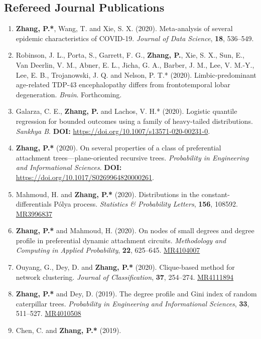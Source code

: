 \documentclass[margin]{res}
\def\MR#1{\href{http://www.ams.org/mathscinet-getitem?mr=#1}{MR#1}}
\begin{document}
\begin{resume}
\subsection{Refereed Journal Publications}
\begin{enumerate}
	\item {\sc \bf Zhang, P.*}, {\sc Wang, T.} and {\sc Xie, S. X.} 
	(2020). Meta-analysis of several epidemic characteristics of 
	COVID-19. {\em Journal of Data Science}, {\bf 18}, 536--549.
	\item {\sc Robinson, J. L., Porta, S., Garrett, F. G.}, {\sc \bf 
	Zhang, P.}, {\sc Xie, S. X., Sun, E., Van Deerlin, V. M., Abner, 
	E. L., Jicha, G. A., Barber, J. M., Lee, V. M.-Y., Lee, E. B., 
	Trojanowski, J. Q.} and {\sc Nelson, P. T.*} (2020). 
	Limbic-predominant age-related TDP-43 encephalopathy differs 
	from frontotemporal lobar degeneration. {\em Brain}. 
	Forthcoming. 
	\item {\sc Galarza, C. E.}, {\sc \bf Zhang, P.} and {\sc Lachos, 
	V. H.*} (2020). Logistic quantile regression for bounded 
	outcomes 
	using a family of heavy-tailed distributions. {\em Sankhya B}. 
	\textbf{DOI:} \url{https://doi.org/10.1007/s13571-020-00231-0}.
	\item {\sc \bf Zhang, P.*} (2020). On several properties of a 
	class of preferential attachment trees---plane-oriented 
	recursive trees. {\em Probability in Engineering and 
	Informational Sciences}. 
	\textbf{DOI:} \url{https://doi.org/10.1017/S0269964820000261}.
	\item {\sc Mahmoud, H.} and {\sc \bf Zhang, P.*} (2020). 
	Distributions in the constant-differentials P\'{o}lya process. 
	{\em Statistics \& Probability Letters}, \textbf{156}, 108592. 
	\MR{3996837}
	\item {\sc \bf Zhang, P.*} and {\sc Mahmoud, H.} (2020). On 
	nodes of small degrees and degree profile in preferential 
	dynamic attachment circuits. {\em Methodology and Computing in 
	Applied Probability}, \textbf{22}, 625--645. \MR{4104007}
	\item {\sc Ouyang, G., Dey, D.} and {\sc \bf Zhang, P.*} (2020). 
	Clique-based method for network clustering. {\em Journal of 
	Classification}, \textbf{37}, 254--274. \MR{4111894}
	\item {\sc \bf Zhang, P.*} and {\sc Dey, D.} (2019). The degree 
	profile and Gini index of random caterpillar trees. {\em 
	Probability in Engineering and Informational Sciences}, 
	\textbf{33}, 511--527. \MR{4010508}
	\item {\sc Chen, C.} and {\sc \bf Zhang, P.*} (2019). {\em 
}
\end{enumerate}
\end{resume}
\end{document}
